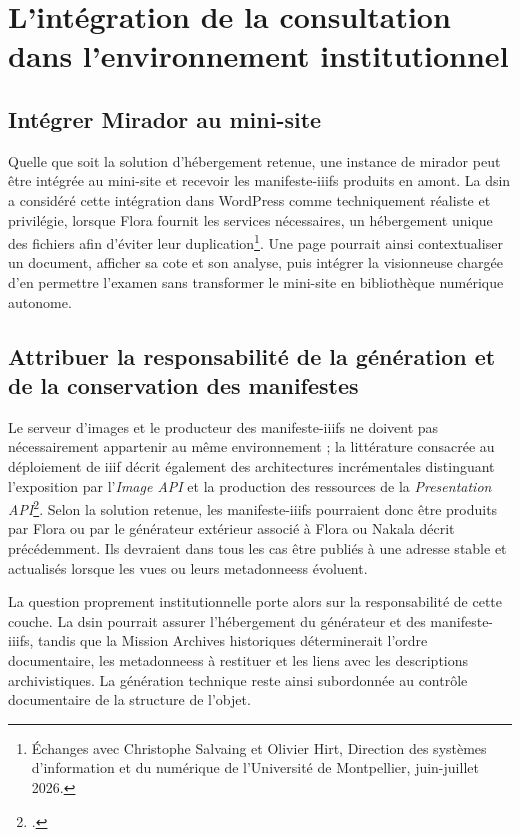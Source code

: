 \section{L'intégration de la consultation dans l'environnement institutionnel}
\label{sec:integration-consultation-numerique}

\subsection{Intégrer Mirador au mini-site}

Quelle que soit la solution d'hébergement retenue, une instance de \gls{mirador} peut être intégrée au mini-site et recevoir les \glspl{manifeste-iiif} produits en amont. La \gls{dsin} a considéré cette intégration dans WordPress comme techniquement réaliste et privilégie, lorsque Flora fournit les services nécessaires, un hébergement unique des fichiers afin d'éviter leur duplication\footnote{Échanges avec Christophe Salvaing et Olivier Hirt, Direction des systèmes d'information et du numérique de l'Université de Montpellier, juin-juillet 2026.}. Une page pourrait ainsi contextualiser un document, afficher sa cote et son analyse, puis intégrer la visionneuse chargée d'en permettre l'examen sans transformer le mini-site en bibliothèque numérique autonome.


\subsection{Attribuer la responsabilité de la génération et de la conservation des manifestes}

Le serveur d'images et le producteur des \glspl{manifeste-iiif} ne doivent pas nécessairement appartenir au même environnement ; la littérature consacrée au déploiement de \gls{iiif} décrit également des architectures incrémentales distinguant l'exposition par l'\emph{Image API} et la production des ressources de la \emph{Presentation API}\footcite{RaemyDemleitner2022}. Selon la solution retenue, les \glspl{manifeste-iiif} pourraient donc être produits par Flora ou par le générateur extérieur associé à Flora ou Nakala décrit précédemment. Ils devraient dans tous les cas être publiés à une adresse stable et actualisés lorsque les vues ou leurs \glspl{metadonnees} évoluent.

La question proprement institutionnelle porte alors sur la responsabilité de cette couche. La \gls{dsin} pourrait assurer l'hébergement du générateur et des \glspl{manifeste-iiif}, tandis que la Mission Archives historiques déterminerait l'ordre documentaire, les \glspl{metadonnees} à restituer et les liens avec les descriptions archivistiques. La génération technique reste ainsi subordonnée au contrôle documentaire de la structure de l'objet.


